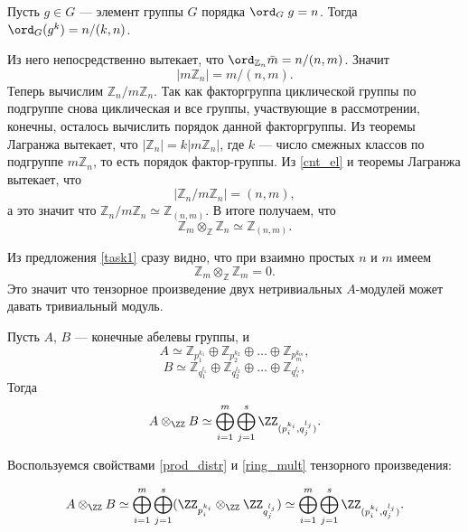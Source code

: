 \begin{Proof}
        \begin{Statement}
            \cite{Vinberg} Пусть $g \in G$ --- элемент группы $G$ порядка $\ord_G\;g = n$. Тогда $\ord_G(g^k) = n/(k, n)$.
        \end{Statement}
        Из него непосредственно вытекает, что $\ord_{\mathbb{Z}_n} \bar m = n / (n, m)$. Значит 
        \begin{equation} \label{cnt_el}
            |m\mathbb{Z}_n| = m / (n, m). 
        \end{equation}
        Теперь вычислим $\mathbb{Z}_n / m\mathbb{Z}_n$. Так как факторгруппа циклической группы по подгруппе снова циклическая и все группы, участвующие
        в рассмотрении, конечны, осталось вычислить порядок данной факторгруппы. Из теоремы Лагранжа вытекает, что $|\mathbb{Z}_n| = k|m\mathbb{Z}_n|$, где $k$ --- число смежных классов по
        подгруппе $m\mathbb{Z}_n$, то есть порядок фактор-группы. Из \eqref{cnt_el} и теоремы Лагранжа вытекает, что 
        \begin{equation*}
            |\mathbb{Z}_n / m\mathbb{Z}_n| = (n, m),
        \end{equation*}
        а это значит что $\mathbb{Z}_n / m\mathbb{Z}_n \simeq \mathbb{Z}_{(n, m)}$. В итоге получаем, что
        \begin{equation*}
            \mathbb{Z}_m \otimes_\mathbb{Z} \mathbb{Z}_n \simeq \mathbb{Z}_{(n, m)}.
        \end{equation*}
    \end{Proof}

    Из предложения \ref{task1} сразу видно, что при взаимно простых $n$ и $m$ имеем $$\mathbb{Z}_m \otimes_\mathbb{Z} \mathbb{Z}_m = 0.$$ Это значит что тензорное произведение
    двух нетривиальных $A$-модулей может давать тривиальный модуль.

    \begin{Proposal}
        Пусть $A$, $B$ --- конечные абелевы группы, и
        $$
            A \simeq \mathbb{Z}_{p_1^{k_1}} \oplus \mathbb{Z}_{p_2^{k_2}} \oplus \dots \oplus \mathbb{Z}_{p_m^{k_m}},
        $$
        $$
            B \simeq \mathbb{Z}_{q_1^{l_1}} \oplus \mathbb{Z}_{q_2^{l_2}} \oplus \dots \oplus \mathbb{Z}_{q_s^{l_s}},
        $$
        Тогда 
        $$A \otimes_\ZZ B \simeq \bigoplus_{i=1}^{m} \bigoplus_{j=1}^{s} \ZZ_{(p_i^{k_i}, q_j^{l_j})}.$$
    \end{Proposal}
    \begin{Proof}
        Воспользуемся свойствами \eqref{prod_distr} и \eqref{ring_mult} тензорного произведения:

        $$
        A \otimes_\ZZ B \simeq \bigoplus_{i=1}^{m} \bigoplus_{j=1}^{s} (\ZZ_{p_i^{k_i}} \otimes_\ZZ \ZZ_{q_j^{l_j}}) \simeq 
            \bigoplus_{i=1}^{m} \bigoplus_{j=1}^{s} \ZZ_{(p_i^{k_i}, q_j^{l_j})}.
        $$
    \end{Proof}

